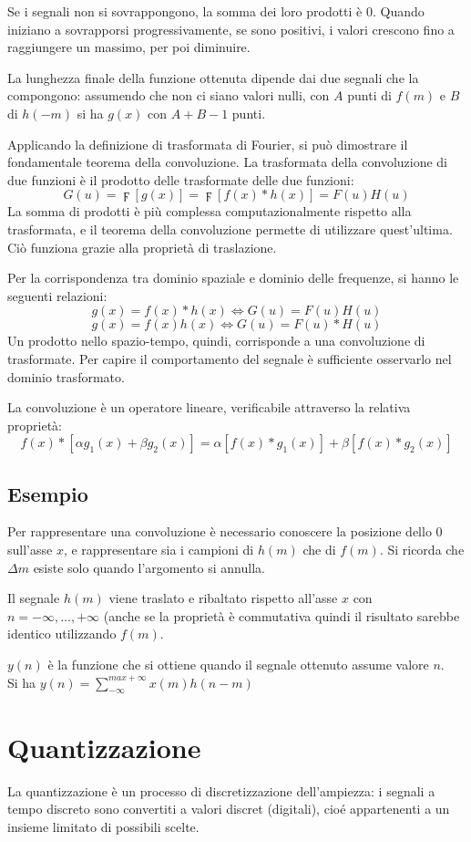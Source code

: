 Se i segnali non si sovrappongono, la somma dei loro prodotti è 0. Quando iniziano a sovrapporsi progressivamente, se sono positivi, i valori crescono fino a raggiungere un massimo, per poi diminuire.

La lunghezza finale della funzione ottenuta dipende dai due segnali che la compongono: assumendo che non ci siano valori nulli, con $A$ punti di $f(m)$ e $B$ di $h(-m)$ si ha $g(x)$ con $A + B - 1$ punti.

Applicando la definizione di trasformata di Fourier, si può dimostrare il fondamentale teorema della convoluzione. La trasformata della convoluzione di due funzioni è il prodotto delle trasformate delle due funzioni: 
$$G(u) = \digamma[g(x)] = \digamma[f(x) * h(x)] = F(u)H(u)$$
La somma di prodotti è più complessa computazionalmente rispetto alla trasformata, e il teorema della convoluzione permette di utilizzare quest'ultima. Ciò funziona grazie alla proprietà di traslazione. 

Per la corrispondenza tra dominio spaziale e dominio delle frequenze, si hanno le seguenti relazioni:
$$g(x) = f(x) * h(x) \Longleftrightarrow G(u) = F(u)H(u)$$
$$g(x) = f(x)h(x) \Longleftrightarrow G(u) = F(u) * H(u)$$
Un prodotto nello spazio-tempo, quindi, corrisponde a una convoluzione di trasformate. Per capire il comportamento del segnale è sufficiente osservarlo nel dominio trasformato.

La convoluzione è un operatore lineare, verificabile attraverso la relativa proprietà:
$$f(x) * [\alpha g_1(x) + \beta g_2(x)] = \alpha[f(x) * g_1(x)] + \beta[f(x) * g_2(x)]$$

\subsection{Esempio}
Per rappresentare una convoluzione è necessario conoscere la posizione dello 0 sull'asse $x$, e rappresentare sia i campioni di $h(m)$ che di $f(m)$. Si ricorda che $\Delta m$ esiste solo quando l'argomento si annulla.

Il segnale $h(m)$ viene traslato e ribaltato rispetto all'asse $x$ con $n = -\infty, \dots, +\infty$ (anche se la proprietà è commutativa quindi il risultato sarebbe identico utilizzando $f(m)$. 

$y(n)$ è la funzione che si ottiene quando il segnale ottenuto assume valore $n$. \\
Si ha $y(n) = \sum_{-\infty}^{max+\infty} x(m)h(n - m)$

\section{Quantizzazione}
La quantizzazione è un processo di discretizzazione dell'ampiezza: i segnali a tempo discreto sono convertiti a valori discret (digitali), cioé appartenenti a un insieme limitato di possibili scelte.

